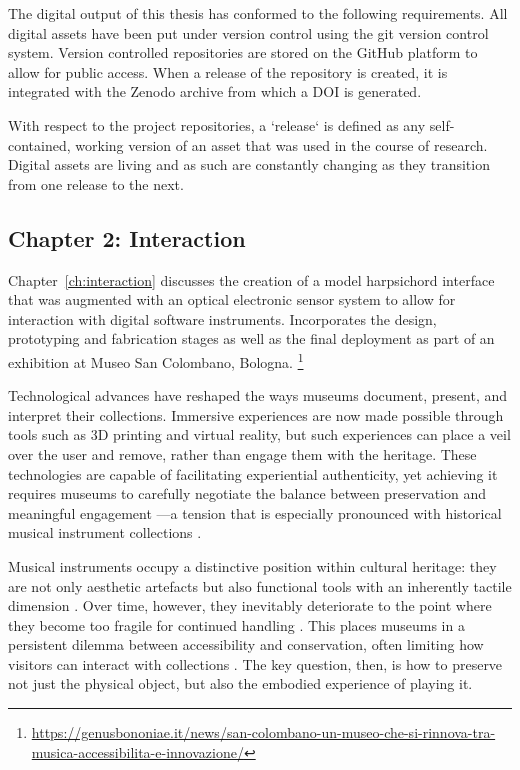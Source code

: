 The digital output of this thesis has conformed to the following requirements.
All digital assets have been put under version control using the git version
control system. Version controlled repositories are stored on the GitHub
platform to allow for public access. When a release of the repository is
created, it is integrated with the Zenodo archive from which a DOI is generated.

With respect to the project repositories, a `release` is defined as any
self-contained, working version of an asset that was used in the course of
research. Digital assets are living and as such are constantly changing as they
transition from one release to the next.

\subsection{Chapter 2: Interaction}

Chapter~\ref{ch:interaction} discusses the creation of a model harpsichord
interface that was augmented with an optical electronic sensor system to allow
for interaction with digital software instruments. Incorporates the design,
prototyping and fabrication stages as well as the final deployment as part of an
exhibition at Museo San Colombano, Bologna.
\footnote{\url{https://genusbononiae.it/news/san-colombano-un-museo-che-si-rinnova-tra-musica-accessibilita-e-innovazione/}}

Technological advances have reshaped the ways museums document, present, and
interpret their collections. Immersive experiences are now made possible through
tools such as 3D printing and virtual reality, but such experiences can place a
veil over the user and remove, rather than engage them with the heritage. These
technologies are capable of facilitating experiential authenticity, yet
achieving it requires museums to carefully negotiate the balance between
preservation and meaningful engagement \cite{pine_museums_2007}—a tension that
is especially pronounced with historical musical instrument collections
\cite{mcalpine_sampling_2014}.

Musical instruments occupy a distinctive position within cultural heritage: they
are not only aesthetic artefacts but also functional tools with an inherently
tactile dimension \cite{charalampos_role_2018}. Over time, however, they
inevitably deteriorate to the point where they become too fragile for continued
handling \cite{paradiso_to-save_2019}. This places museums in a persistent
dilemma between accessibility and conservation, often limiting how visitors can
interact with collections \cite{templeton_museum_2018,mcalpine_sampling_2014}.
The key question, then, is how to preserve not just the physical object, but
also the embodied experience of playing it.

